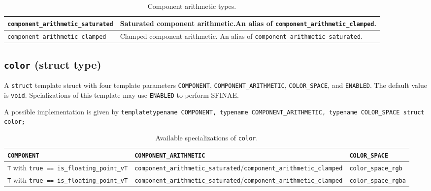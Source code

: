 \documentclass[oneside]{book}
\begin{document}
\begin{table}[h]
\begin{tabularx}{\textwidth}{|>{\hsize}L|>{\hsize}L|}
\hline
\texttt{component\_arithmetic\_saturated} & Saturated component arithmetic.\newline An alias of \texttt{component\_arithmetic\_clamped}.\\
\hline
\texttt{component\_arithmetic\_clamped}   & Clamped component arithmetic. \newline An alias of \texttt{component\_arithmetic\_saturated}.\\
\hline
\end{tabularx}
\caption{Component arithmetic types.}
\label{table:component-arithmetic-types}
\end{table}

\subsection{\texttt{color} (struct type)}
A \texttt{struct} template struct with four template parameters \texttt{COMPONENT},
\texttt{COMPONENT\_ARITHMETIC}, \texttt{COLOR\_SPACE}, and \texttt{ENABLED}. The
default value is \texttt{void}. Speializations of this template may use \texttt{ENABLED}
to perform SFINAE.\newline

A possible implementation is given by\newline
\texttt{template\textlangle typename COMPONENT, typename COMPONENT\_ARITHMETIC, typename COLOR\_SPACE\textrangle\newline
struct color;}\newline


\begin{table}[h]
\begin{tabularx}{\textwidth}{|>{\hsize}L|>{\hsize}L|>{\hsize}L|}
\hline
\texttt{COMPONENT}                                           & \texttt{COMPONENT\_ARITHMETIC}                                                          & \texttt{COLOR\_SPACE}\\
\hline
\texttt{T} with \texttt{true == is\_floating\_point\_v{T}}   & \texttt{component\_arithmetic\_saturated}/\newline\texttt{component\_arithmetic\_clamped}& \texttt{color\_space\_rgb}\\
\hline
\texttt{T} with \texttt{true == is\_floating\_point\_v{T}}   & \texttt{component\_arithmetic\_saturated}/\newline\texttt{component\_arithmetic\_clamped}& \texttt{color\_space\_rgba}\\
\hline
\end{tabularx}
\caption{Available specializations of \texttt{color}.}
\label{table:specializations-of-color}
\end{table}
\end{document}
